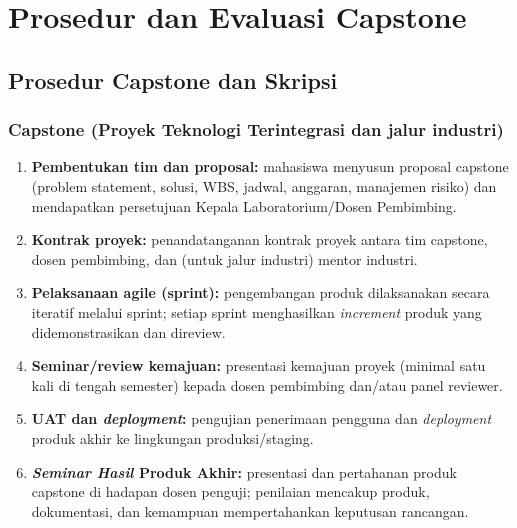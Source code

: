 \documentclass[12pt,a4paper]{report}
\begin{document}
\chapter{Prosedur dan Evaluasi Capstone}

\section{Prosedur Capstone dan Skripsi}

\subsection*{Capstone (Proyek Teknologi Terintegrasi dan jalur industri)}
\begin{enumerate}
\item \textbf{Pembentukan tim dan proposal:} mahasiswa menyusun proposal capstone (problem statement, solusi, WBS, jadwal, anggaran, manajemen risiko) dan mendapatkan persetujuan Kepala Laboratorium/Dosen Pembimbing.
\item \textbf{Kontrak proyek:} penandatanganan kontrak proyek antara tim capstone, dosen pembimbing, dan (untuk jalur industri) mentor industri.
\item \textbf{Pelaksanaan agile (sprint):} pengembangan produk dilaksanakan secara iteratif melalui sprint; setiap sprint menghasilkan \emph{increment} produk yang didemonstrasikan dan direview.
\item \textbf{Seminar/review kemajuan:} presentasi kemajuan proyek (minimal satu kali di tengah semester) kepada dosen pembimbing dan/atau panel reviewer.
\item \textbf{UAT dan \emph{deployment}:} pengujian penerimaan pengguna dan \emph{deployment} produk akhir ke lingkungan produksi/staging.
\item \textbf{\emph{Seminar Hasil} Produk Akhir:} presentasi dan pertahanan produk capstone di hadapan dosen penguji; penilaian mencakup produk, dokumentasi, dan kemampuan mempertahankan keputusan rancangan.
\end{enumerate}
\end{document}
